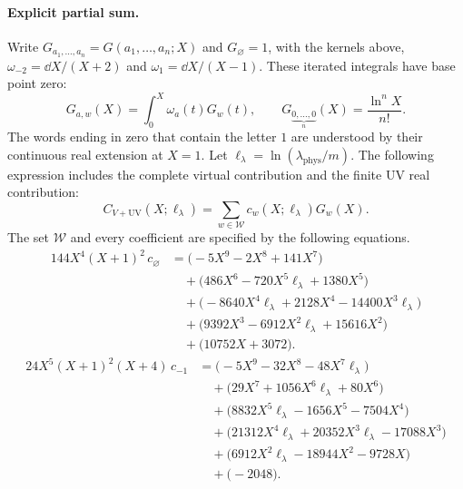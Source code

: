 \paragraph{Explicit partial sum.}
Write $G_{a_1,\ldots,a_n}=G(a_1,\ldots,a_n;X)$ and $G_{\varnothing}=1$,
with the kernels above, $\omega_{-2}=\dd X/(X+2)$ and $\omega_1=\dd X/(X-1)$.
These iterated integrals have base point zero:
\begin{equation}
 G_{a,w}(X)=\int_0^X\omega_a(t)G_w(t),\qquad G_{\underbrace{\scriptstyle 0,\ldots,0}_{n}}(X)=\frac{\ln^nX}{n!}.
\end{equation}
The words ending in zero that contain the letter $1$ are understood by their continuous real extension at $X=1$.
Let $\ell_\lambda=\ln(\lambda_{\mathrm{phys}}/m)$.  The following expression includes the complete virtual contribution and the finite UV real contribution:
\begin{equation}
 C_{V+\mathrm{UV}}(X;\ell_\lambda)=\sum_{w\in\mathcal W}c_w(X;\ell_\lambda)G_w(X).
\end{equation}
The set $\mathcal W$ and every coefficient are specified by the following equations.
\begin{equation}
\begin{aligned}
144 X^{4} \left(X + 1\right)^{2}\,c_{\varnothing}&={}\bigl(- 5 X^{9} - 2 X^{8} + 141 X^{7}\bigr)\\
&\quad{}+\bigl(486 X^{6} - 720 X^{5} \ell_\lambda + 1380 X^{5}\bigr)\\
&\quad{}+\bigl(- 8640 X^{4} \ell_\lambda + 2128 X^{4} - 14400 X^{3} \ell_\lambda\bigr)\\
&\quad{}+\bigl(9392 X^{3} - 6912 X^{2} \ell_\lambda + 15616 X^{2}\bigr)\\
&\quad{}+\bigl(10752 X + 3072\bigr).
\end{aligned}
\end{equation}
\begin{equation}
\begin{aligned}
24 X^{5} \left(X + 1\right)^{2} \left(X + 4\right)\,c_{-1}&={}\bigl(- 5 X^{9} - 32 X^{8} - 48 X^{7} \ell_\lambda\bigr)\\
&\quad{}+\bigl(29 X^{7} + 1056 X^{6} \ell_\lambda + 80 X^{6}\bigr)\\
&\quad{}+\bigl(8832 X^{5} \ell_\lambda - 1656 X^{5} - 7504 X^{4}\bigr)\\
&\quad{}+\bigl(21312 X^{4} \ell_\lambda + 20352 X^{3} \ell_\lambda - 17088 X^{3}\bigr)\\
&\quad{}+\bigl(6912 X^{2} \ell_\lambda - 18944 X^{2} - 9728 X\bigr)\\
&\quad{}+\bigl(-2048\bigr).
\end{aligned}
\end{equation}
